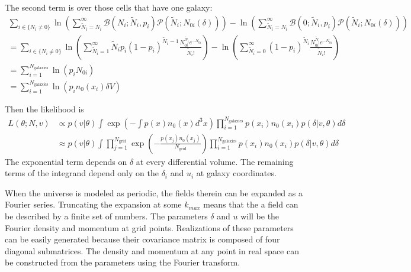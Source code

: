 \documentclass{article}
\begin{document}
The second term is over those cells that have one galaxy:
\begin{align}
\sum_{i \in \{N_i \ne 0\}}
\ln{  \left( \sum_{\tilde{N}_i =N_i}^\infty  \mathcal{B}(N_i; \tilde{N}_i, p_i) \mathcal{P}(\tilde{N}_i ; N_{0i}(\delta))\right)} -
 \ln{  \left( \sum_{\tilde{N}_i =N_i}^\infty  \mathcal{B}(0; \tilde{N}_i, p_i) \mathcal{P}(\tilde{N}_i ; N_{0i}(\delta))\right)}\\
 =\sum_{i \in \{N_i \ne 0\}} \ln{  \left( \sum_{\tilde{N}_i =1}^\infty   \tilde{N}_i p_i (1-p_i)^{ \tilde{N}_i-1} \frac{N_{0i}^{\tilde{N}_i} e^{-N_{0i}}}{\tilde{N}_i!} \right)}
- \ln{  \left( \sum_{\tilde{N}_i =0}^\infty   (1-p_i)^{ \tilde{N}_i} \frac{N_{0i}^{\tilde{N}_i} e^{-N_{0i}}}{\tilde{N}_i!} \right)} \\
 = \sum_{i=1}^{N_{\text{galaxies}}} \ln{  \left(  p_i  {N_{0i} } \right)} \\
  = \sum_{i=1}^{N_{\text{galaxies}}} \ln{  \left(  p_i  n_{0}(x_i) \delta V \right)}
\end{align}

Then the likelihood is
\begin{align}
L(\theta; N, v) 
&\propto p(v|\theta)  \int \exp \left(- \int  p(x) n_{0}(x) d^3x\right)  \prod_{i=1}^{N_{\text{galaxies}}} p(x_i) n_0(x_i)  p(\delta| v, \theta) d\delta \\
& \approx p(v|\theta)  \int \prod_{j=1}^{N_\text{grid}} \exp \left( - \frac{p(x_j) n_{0}(x_j)}{N_\text{grid}}\right) \prod_{i=1}^{N_{\text{galaxies}}} p(x_i) n_0(x_i)  p(\delta| v, \theta) d\delta 
\end{align}
The exponential term depends on $\delta$ at every differential volume.  The
remaining terms of the integrand depend only on the $\delta_i$ and $u_i$ at galaxy coordinates.

When the universe is modeled as periodic, the fields therein can be expanded as a Fourier series.  Truncating the expansion at some $k_{max}$
means that the a field can be described by a finite set of numbers.  The parameters $\delta$ and $u$ will be
the Fourier density and momentum at grid points.  Realizations of these parameters can be easily generated because their 
 covariance matrix is composed of four diagonal submatrices. 
The density and momentum at any point in real space can be constructed from the parameters using the Fourier transform.
\end{document}
